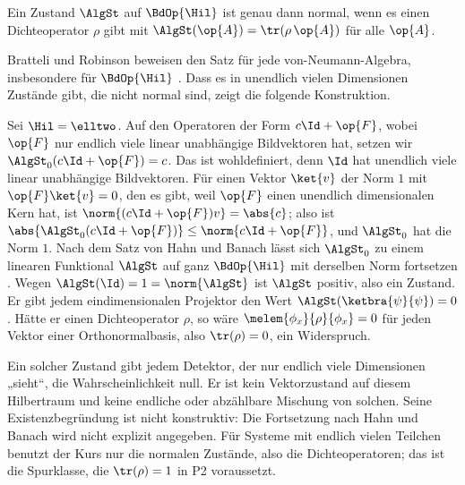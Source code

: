 \begin{vertiefung}
  \begin{theorem}\label{c04.thm.normal}
    Ein Zustand $\AlgSt$ auf $\BdOp{\Hil}$ ist genau dann normal, wenn es einen Dichteoperator
    $\rho$ gibt mit $\AlgSt(\op{A}) = \tr(\rho\,\op{A})$ für alle $\op{A}$.
  \end{theorem}

  Bratteli und Robinson beweisen den Satz für jede von-Neumann-Algebra, insbesondere für
  $\BdOp{\Hil}$ . Dass es in unendlich vielen Dimensionen
  Zustände gibt, die nicht normal sind, zeigt die folgende Konstruktion.

  \begin{example}\label{c04.ex.singulaer}
    Sei $\Hil = \elltwo$. Auf den Operatoren der Form $c\Id + \op{F}$, wobei $\op{F}$ nur endlich
    viele linear unabhängige Bildvektoren hat, setzen wir $\AlgSt_0(c\Id + \op{F}) = c$. Das ist
    wohldefiniert, denn $\Id$ hat unendlich viele linear unabhängige Bildvektoren. Für einen
    Vektor $\ket{v}$ der Norm $1$ mit $\op{F}\ket{v} = 0$, den es gibt, weil $\op{F}$ einen unendlich
    dimensionalen Kern hat, ist $\norm{(c\Id + \op{F})v} = \abs{c}$; also ist
    $\abs{\AlgSt_0(c\Id + \op{F})} \leq \norm{c\Id + \op{F}}$, und $\AlgSt_0$ hat die Norm $1$. Nach
    dem Satz von Hahn und Banach lässt sich $\AlgSt_0$ zu einem linearen Funktional $\AlgSt$ auf
    ganz $\BdOp{\Hil}$ mit derselben Norm fortsetzen . Wegen
    $\AlgSt(\Id) = 1 = \norm{\AlgSt}$ ist $\AlgSt$ positiv, also ein Zustand. Er gibt jedem
    eindimensionalen Projektor den Wert $\AlgSt(\ketbra{\psi}{\psi}) = 0$. Hätte er einen
    Dichteoperator $\rho$, so wäre $\melem{\phi_x}{\rho}{\phi_x} = 0$ für jeden Vektor einer
    Orthonormalbasis, also $\tr(\rho) = 0$, ein Widerspruch.
  \end{example}

  Ein solcher Zustand gibt jedem Detektor, der nur endlich viele Dimensionen „sieht“, die
  Wahrscheinlichkeit null. Er ist kein Vektorzustand auf diesem Hilbertraum und keine endliche oder
  abzählbare Mischung von solchen. Seine Existenzbegründung ist nicht konstruktiv: Die Fortsetzung
  nach Hahn und Banach wird nicht explizit angegeben. Für Systeme mit
  endlich vielen Teilchen benutzt der Kurs nur die normalen Zustände, also die Dichteoperatoren;
  das ist die Spurklasse, die $\tr(\rho) = 1$ in P2 voraussetzt.
\end{vertiefung}

